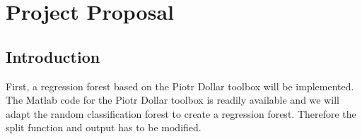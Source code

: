 %





\newcommand{\TUGn}{Graz University of Technology}

\address[ICG]{Inst. for Computer Graphics and Vision \\ \TUGn, Austria}



















\begin{abstract}








\end{abstract}



\section{Project Proposal}

\subsection{Introduction} %
\label{sub:intro}
First, a regression forest based on the Piotr Dollar toolbox \cite{piotr} will be implemented. The Matlab code for the Piotr Dollar toolbox is readily available and we will adapt the random classification forest to create a regression forest. Therefore the split function and output has to be modified.

